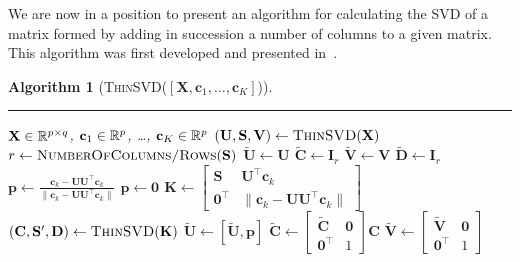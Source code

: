 \documentclass[11pt,a4paper]{article}
\theoremstyle{break}
\newtheorem*{algorithm}{Algorithm}
\numberwithin{dummy}{section}
\theoremstyle{plain}
\theoremstyle{plain}
\theoremstyle{plain}
\theoremstyle{plain}
\theoremstyle{plain}
\theoremstyle{MyNonumberplain}
\newcommand{\0}{\M{0}}
\newcommand{\M}[1]{\mathbf{#1}}
\newcommand{\Mt}[1]{\tilde{\M{#1}}}
\newcommand{\R}{\mathbb{R}}
\newcommand{\T}{\top}
\newcommand{\ve}[1]{\mathbf{#1}}
\newcommand{\Mat}[2]{%
  \ifthenelse{\equal{#2}{1}}
  {\R^{#1}}
  {\R^{#1 \times #2}}
}
\begin{document}
We are now in a position to present an algorithm for calculating the SVD of a matrix formed by adding in succession a number of columns to a given matrix. This algorithm was first developed and presented in~\cite{brand06:_fast}.

\begin{algorithm}[\textnormal{\textsc{ThinSVD}(\unboldmath$[\M{X}, \ve{c}_1, \dots, \ve{c}_K]$)}]
  \rule{\textwidth}{0.4pt}
  \begin{algorithmic}[1]
    \Require $\M{X} \in \Mat{p}{q}$, $\ve{c}_1 \in \Mat{p}{1}$, \dots, $\ve{c}_K \in \Mat{p}{1}$
    \State $(\M{U}, \M{S}, \M{V}) \gets \textsc{ThinSVD}(\M{X})$
    \State $r \gets \textsc{NumberOfColumns/Rows}(\M{S})$
    \State $\Mt{U} \gets \M{U}$
    \State $\Mt{C} \gets \M{I}_r$
    \State $\Mt{V} \gets \M{V}$
    \State $\Mt{D} \gets \M{I}_r$
    \If {$\ve{c}_k - \M{U}\M{U}^\T \ve{c}_k \neq \0$ }
    \State $\ve{p} \gets \frac{\ve{c}_k - \M{U}\M{U}^\T \ve{c}_k}{\| \ve{c}_k - \M{U}\M{U}^\T \ve{c}_k\|} $
    \Else
    \State $\ve{p} \gets \0$
    \EndIf
    \State  
    \begin{math}
      \M{K}
      \gets
      \begin{bmatrix}
        \M{S} & \M{U}^\T \ve{c}_k \\
        \0^\T & \| \ve{c}_k - \M{U} \M{U}^\T \ve{c}_k \|
      \end{bmatrix}
    \end{math}
    \State
    $(\M{C}, \M{S}', \M{D}) \gets \textsc{ThinSVD}(\M{K})$
    \If {$\ve{p} \neq \0$}
    \State
    \begin{math}
      \Mt{U} \gets [\Mt{U}, \ve{p}]
    \end{math}
    \State
    \begin{math}
      \Mt{C}
      \gets
      \begin{bmatrix}
        \Mt{C} & \0
        \\
        \0^\T & 1
      \end{bmatrix}
      \M{C}
    \end{math}
    \State
    \begin{math}
      \Mt{V}
      \gets
      \begin{bmatrix}
        \Mt{V} & \0
        \\
        \0^\T & 1
      \end{bmatrix} 
    \end{math}

\end{algorithmic}
\end{algorithm}
\end{document}

